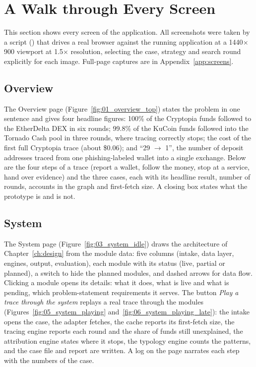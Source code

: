 \section{A Walk through Every Screen}
\label{sec:screens}
This section shows every screen of the application. All screenshots were taken by a script () that drives a real browser against the running application at a 1440$\times$900 viewport at 1.5$\times$ resolution, selecting the case, strategy and search round explicitly for each image. Full-page captures are in Appendix~\ref{app:screens}.

\subsection{Overview}
The Overview page (Figure~\ref{fig:01_overview_top}) states the problem in one sentence and gives four headline figures: 100\% of the Cryptopia funds followed to the EtherDelta DEX in six rounds; 99.8\% of the KuCoin funds followed into the Tornado Cash pool in three rounds, where tracing correctly stops; the cost of the first full Cryptopia trace (about \$0.06); and ``29 $\to$ 1'', the number of deposit addresses traced from one phishing-labeled wallet into a single exchange. Below are the four steps of a trace (report a wallet, follow the money, stop at a service, hand over evidence) and the three cases, each with its headline result, number of rounds, accounts in the graph and first-fetch size. A closing box states what the prototype is and is not.


\subsection{System}
The System page (Figure~\ref{fig:03_system_idle}) draws the architecture of Chapter~\ref{ch:design} from the module data: five columns (intake, data layer, engines, output, evaluation), each module with its status (live, partial or planned), a switch to hide the planned modules, and dashed arrows for data flow. Clicking a module opens its details: what it does, what is live and what is pending, which problem-statement requirements it serves. The button \emph{Play a trace through the system} replays a real trace through the modules (Figures~\ref{fig:05_system_playing} and~\ref{fig:06_system_playing_late}): the intake opens the case, the adapter fetches, the cache reports its first-fetch size, the tracing engine reports each round and the share of funds still unexplained, the attribution engine states where it stops, the typology engine counts the patterns, and the case file and report are written. A log on the page narrates each step with the numbers of the case.

